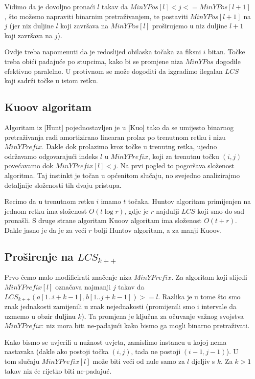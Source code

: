 \documentclass[times, utf8, seminar, numeric]{fer}
\begin{document}
Vidimo da je dovoljno pronaći $l$ takav da $MinYPos[l] < j <=
MinYPos[l+1]$, što možemo napraviti binarnim pretraživanjem, te
postaviti $MinYPos[l+1]$ na $j$ (jer niz duljine $l$ koji završava
na $MinYPos[l]$ proširujemo u niz duljine $l+1$ koji završava na
$j$).

Ovdje treba napomenuti da je redoslijed obilaska točaka za fiksni $i$
bitan. Točke treba obići padajuće po stupcima, kako bi se promjene
niza $MinYPos$ dogodile efektivno paralelno. U protivnom se može
dogoditi da izgradimo ilegalan $LCS$ koji sadrži točke u istom
retku.

\subsection{Kuoov algoritam}
Algoritam iz [Hunt] pojednostavljen je u [Kuo] tako da se umijesto
binarnog pretraživanja radi amortizirano linearan prolaz po trenutnom
retku i nizu $MinYPrefix$. Dakle dok prolazimo kroz točke u trenutng 
retka, ujedno održavamo odgovarajući indeks $l$ u $MinYPrefix$, koji
za trenutnu točku $(i, j)$ povećavamo dok $MinYPrefix[l] < j$. 
Na prvi pogled to pogoršava složenost algoritma. Taj instinkt je
točan u općenitom slučaju, no svejedno analizirajmo detaljnije
složenosti tih dvaju pristupa.

Recimo da u trenutnom retku $i$ imamo $t$ točaka. Huntov algoritam
primijenjen na jednom retku ima složenost $O(t \log r)$, gdje je
$r$ najdulji $LCS$ koji smo do sad pronašli. S druge strane algoritam
Kuoov algoritam ima složenost $O(t + r)$. Dakle jasno je da je za
veći $r$ bolji Huntov algoritam, a za manji Kuoov.

\subsection{Proširenje na $LCS_{k++}$}
Prvo ćemo malo modificirati značenje niza $MinYPrefix$.
Za algoritam koji slijedi $MinYPrefix[l]$ označava najmanji $j$
takav da $LCS_{k++}(a[1..i+k-1], b[1..j+k-1]) >= l$. Razlika je
u tome što smo znak jednakosti zamijenili u znak nejednakosti
(promijenili smo i intervale da uzmemo u obzir duljinu $k$). 
Ta promjena je ključna za očuvanje važnog svojstva $MinYPrefix$:
niz mora biti ne-padajući kako bismo ga mogli binarno pretraživati.

Kako bismo se uvjerili u nužnost uvjeta, zamislimo instancu u kojoj
nema nastavaka (dakle ako postoji točka $(i, j)$, tada ne postoji
$(i-1, j-1)$). U tom slučaju $MinYPrefix[l]$ može biti veći od
nule samo za $l$ djeljiv s $k$. Za $k > 1$ takav niz će rijetko
biti ne-padajuć.
\end{document}
